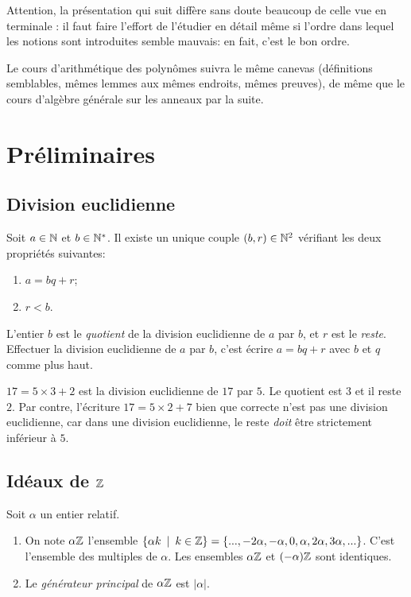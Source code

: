 
Attention, la présentation qui suit diffère sans doute beaucoup de celle vue en terminale : il faut faire l'effort de l'étudier en détail même si l'ordre dans lequel les notions sont introduites semble \og mauvais\fg : en fait, c'est le \og bon\fg{}  ordre.

Le cours d'arithmétique des polynômes suivra le même canevas (définitions semblables, mêmes lemmes aux mêmes endroits, mêmes preuves), de même que le cours d'algèbre générale sur les anneaux par la suite.

\section{Préliminaires}

\subsection{Division euclidienne}
\begin{proposition}
Soit $a\in \mathbb{N}$ et $b\in \mathbb{N}^*$. Il existe un unique couple $(b,r) \in \mathbb{N}^2$ vérifiant les deux propriétés suivantes:
\begin{enumerate}
\item $a=bq+r$;
\item $r < b$.
\end{enumerate}
L'entier $b$ est le \emph{quotient} de la division euclidienne de $a$ par $b$, et $r$ est le \emph{reste}.
Effectuer la division euclidienne de $a$ par $b$, c'est écrire $a = bq+r$ avec $b$ et $q$ comme plus haut.
\end{proposition}

\begin{exemple}
$17=5\times 3 + 2$ est la division euclidienne de $17$ par $5$. Le quotient est $3$ et il reste $2$. Par contre, l'écriture $17=5\times 2+7$ bien que correcte  n'est pas une division euclidienne, car dans une division euclidienne, le reste \emph{doit} être strictement inférieur à $5$.
\end{exemple}

\subsection{Idéaux de $\mathbb{Z}$}

\begin{definition}
Soit $\alpha$ un entier relatif.
\begin{enumerate}
\item On note $\alpha\mathbb{Z}$ l'ensemble $\{ \alpha k\:\mid\: k\in \mathbb{Z}\} = \{..., -2\alpha, -\alpha, 0, \alpha, 2\alpha, 3\alpha, ...\}$. C'est l'ensemble des multiples de $\alpha$. Les ensembles $\alpha\mathbb{Z}$ et $(-\alpha)\mathbb{Z}$ sont identiques.
\item Le \emph{générateur principal} de $\alpha\mathbb{Z}$ est $|\alpha|$.
\end{enumerate}
\end{definition}


